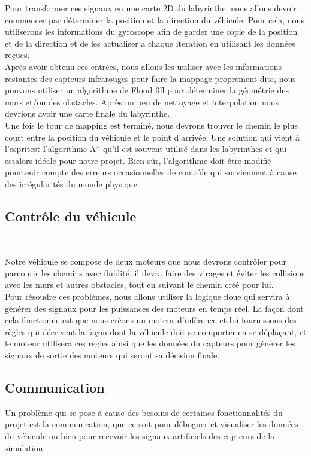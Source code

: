    Pour transformer ces signaux en une carte 2D du labyrinthe, nous allons devoir
commencer par déterminer la position et la direction du véhicule. Pour cela,
nous utiliserons les informations du gyroscope afin de garder une copie de la
position et de la direction et de les actualiser a chaque iteration en
utilisant les données reçues. \\

   Après avoir obtenu ces entrées, nous allons les utiliser avec les informations
restantes des capteurs infrarouges pour faire la mappage proprement dite, nous
pouvons utiliser un algorithme de Flood fill pour déterminer la géométrie des
murs et/ou des obstacles. Après un peu de nettoyage et interpolation nous
devrions avoir une carte finale du labyrinthe. \\

   Une fois le tour de mapping est terminé, nous devrons trouver le chemin le plus
court entre la position du véhicule et le point d'arrivée. Une solution qui
vient à l'espritest l'algorithme A* qu'il est souvent utilisé dans les
labyrinthes et qui estalors idéale pour notre projet. Bien sûr, l'algorithme
doit être modifié pourtenir compte des erreurs occasionnelles de contrôle qui
surviennent à cause des irrégularités du monde physique.

\subsection{Contrôle du véhicule} \label{subsec:ctrlComm}

Notre véhicule se compose de deux moteurs que nous devrons contrôler pour
parcourir les chemins avec fluidité, il devra faire des virages et éviter les
collisions avec les murs et autres obstacles, tout en suivant le chemin créé
pour lui. \\

Pour résoudre ces problèmes, nous allons utiliser la logique floue qui servira
à générer des signaux pour les puissances des moteurs en temps réel. La façon
dont cela fonctionne est que nous créons un moteur d'inférence et lui
fournissons des règles qui décrivent la façon dont la véhicule doit se comporter 
en se déplaçant, et le moteur utilisera ces règles ainsi que les données du
capteurs pour générer les signaux de sortie des moteurs qui seront sa décision
finale.

\subsection{Communication} \label{subsec:mapMaze}
Un problème qui se pose à cause des besoins de certaines fonctionnalités du
projet est la communication, que ce soit pour déboguer et visualiser les
données du véhicule ou bien pour recevoir les signaux artificiels des capteurs
de la simulation. 

